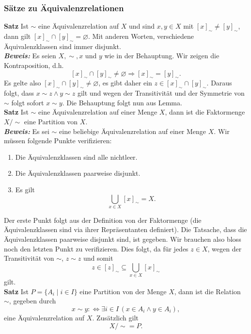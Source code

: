 \subsubsection{Sätze zu Äquivalenzrelationen}%
\label{ssub:sätze_zu_äquivalenzrelationen}
\textbf{Satz }
  Ist $\sim $ eine Äquivalenzrelation auf $X$ und sind $x,y\in X$ mit $[x]_\sim\neq[y]_\sim$, dann gilt $[x]_\sim\cap[y]_\sim=\varnothing$.
    Mit anderen Worten, verschiedene Äquivalenzklassen sind immer disjunkt.\\
\textbf{\textit{Beweis: }} 
Es seien $X,\sim,x$ und $y$ wie in der Behauptung. Wir zeigen die Kontraposition, d.h.
    \[
    [x]_\sim\cap[y]_\sim\neq\varnothing\Rightarrow [x]_\sim=[y]_\sim.
    \]
    Es gelte also $[x]_\sim\cap[y]_\sim\neq\varnothing$, es gibt daher ein $z\in [x]_\sim\cap[y]_\sim$. Daraus folgt,
    dass $x\sim z\land y\sim z$ gilt und wegen der Transitivität und der Symmetrie von $\sim$ folgt sofort $x\sim y$.
    Die Behauptung folgt nun aus Lemma.\\
\textbf{Satz }
Ist $\sim$ eine Äquivalenzrelation auf einer Menge $X$, dann ist die Faktormenge $X/\sim$ eine Partition von $X$.\\ 
\textbf{\textit{Beweis: }} 
Es sei $\sim$ eine beliebige Äquivalenzrelation auf einer Menge $X$. Wir müssen folgende Punkte verifizieren:
    \begin{enumerate}
    \item\label{a} Die Äquivalenzklassen sind alle nichtleer.
    \item\label{2} Die Äquivalenzklassen paarweise disjunkt.
    \item\label{3} Es gilt
    \[
    \bigcup_{x\in X}[x]_{\sim}=X.
    \]
    \end{enumerate}
    Der erste Punkt folgt aus der Definition von der Faktormenge (die Äquivalenzklassen sind via ihrer Repräsentanten definiert). Die Tatsache, dass die Äquivalenzklassen paarweise disjunkt sind, ist gegeben. Wir brauchen also bloss noch den letzten Punkt zu verifizieren. Dies folgt, da für jedes $z\in X$, wegen der Transitivität von $\sim$, $z\sim z$ und somit
    \[
    z\in[z]_\sim\subseteq\bigcup_{x\in X}[x]_\sim
    \]
    gilt.\\
\textbf{Satz }
    Ist $P=\{A_i\mid i\in I\}$ eine Partition von der Menge $X$, dann ist die Relation $\sim$, gegeben durch
    \[
    x\sim y:\Leftrightarrow \exists i\in I\,(x\in A_i\land y\in A_i),
    \]
    eine Äquivalenzrelation auf $X$. Zusätzlich gilt
    \[
    X/\sim=P.
    \]\\
